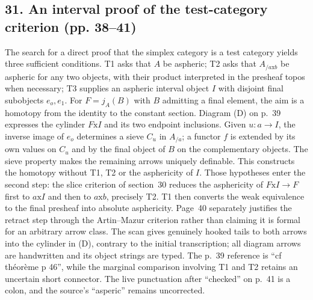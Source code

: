 \subsection*{31. An interval proof of the test-category criterion (pp. 38--41)}
The search for a direct proof that the simplex category is a test category yields three sufficient conditions. T1 asks that $A$ be aspheric; T2 asks that $A_{/a\mathrm{x}b}$ be aspheric for any two objects, with their product interpreted in the presheaf topos when necessary; T3 supplies an aspheric interval object $I$ with disjoint final subobjects $e_o,e_1$. For $F=j_A(B)$ with $B$ admitting a final element, the aim is a homotopy from the identity to the constant section. Diagram (D) on p.~39 expresses the cylinder $F\mathrm{x}I$ and its two endpoint inclusions. Given $u:a\to I$, the inverse image of $e_o$ determines a sieve $C_u$ in $A_{/a}$; a functor $f$ is extended by its own values on $C_u$ and by the final object of $B$ on the complementary objects. The sieve property makes the remaining arrows uniquely definable. This constructs the homotopy without T1, T2 or the asphericity of $I$. Those hypotheses enter the second step: the slice criterion of section~30 reduces the asphericity of $F\mathrm{x}I\to F$ first to $a\mathrm{x}I$ and then to $a\mathrm{x}b$, precisely T2. T1 then converts the weak equivalence to the final presheaf into absolute asphericity. Page~40 separately justifies the retract step through the Artin--Mazur criterion rather than claiming it is formal for an arbitrary arrow class. The scan gives genuinely hooked tails to both arrows into the cylinder in (D), contrary to the initial transcription; all diagram arrows are handwritten and its object strings are typed. The p.~39 reference is ``cf théorème p 46'', while the marginal comparison involving T1 and T2 retains an uncertain short connector. The live punctuation after ``checked'' on p.~41 is a colon, and the source's ``asperic'' remains uncorrected.

